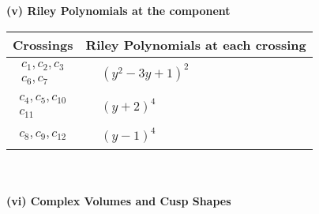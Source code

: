 \documentclass[1p]{elsarticle_modified}
\theoremstyle{definition}
\begin{document}
\newpage\renewcommand{\arraystretch}{1}
\flushleft \textbf{(v) Riley Polynomials at the component}\newline \\
\begin{tabular}{m{50pt}|m{274pt}}
Crossings & \hspace{64pt}Riley Polynomials at each crossing \\
\hline $$\begin{aligned}c_{1},c_{2},c_{3}\\c_{6},c_{7}\end{aligned}$$&$\begin{aligned}
&(y^2-3 y+1)^2
\end{aligned}$\\
\hline $$\begin{aligned}c_{4},c_{5},c_{10}\\c_{11}\end{aligned}$$&$\begin{aligned}
&(y+2)^4
\end{aligned}$\\
\hline $$\begin{aligned}c_{8},c_{9},c_{12}\end{aligned}$$&$\begin{aligned}
&(y-1)^4
\end{aligned}$\\
\hline
\end{tabular}\\~\\
\newpage\flushleft \textbf{(vi) Complex Volumes and Cusp Shapes}
\end{document}
